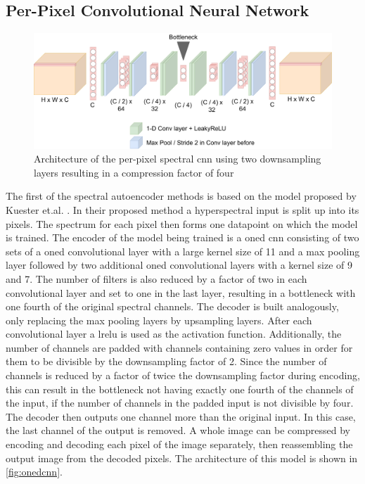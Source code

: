 \subsection{Per-Pixel Convolutional Neural Network\label{sec:conv1d}}
\begin{figure}
\centering
\includegraphics[scale=0.18]{img/OneDCNN.pdf}
\caption[Per-Pixel spectral \ac{cnn}]{Architecture of the per-pixel spectral \ac{cnn} using two downsampling layers resulting in a compression factor of four}
\label{fig:onedcnn}
\end{figure}
The first of the spectral autoencoder methods is based on the model proposed by Kuester et.al. \citep{kuester_1d-convolutional_2021,kuester_transferability_2022}. In their proposed method a hyperspectral input is split up into its pixels. The spectrum for each pixel then forms one datapoint on which the model is trained. The encoder of the model being trained is a \ac{oned} \ac{cnn} consisting of two sets of a \ac{oned} convolutional layer with a large kernel size of 11 and a max pooling layer followed by two additional \ac{oned} convolutional layers with a kernel size of 9 and 7. The number of filters is also reduced by a factor of two in each convolutional layer and set to one in the last layer, resulting in a bottleneck with one fourth of the original spectral channels. The decoder is built analogously, only replacing the max pooling layers by upsampling layers. After each convolutional layer a \ac{lrelu} is used as the activation function. Additionally, the number of channels are padded with channels containing zero values in order for them to be divisible by the downsampling factor of 2. Since the number of channels is reduced by a factor of twice the downsampling factor during encoding, this can result in the bottleneck not having exactly one fourth of the channels of the input, if the number of channels in the padded input is not divisible by four. The decoder then outputs one channel more than the original input. In this case, the last channel of the output is removed. A whole image can be compressed by encoding and decoding each pixel of the image separately, then reassembling the output image from the decoded pixels. The architecture of this model is shown in \autoref{fig:onedcnn}.

